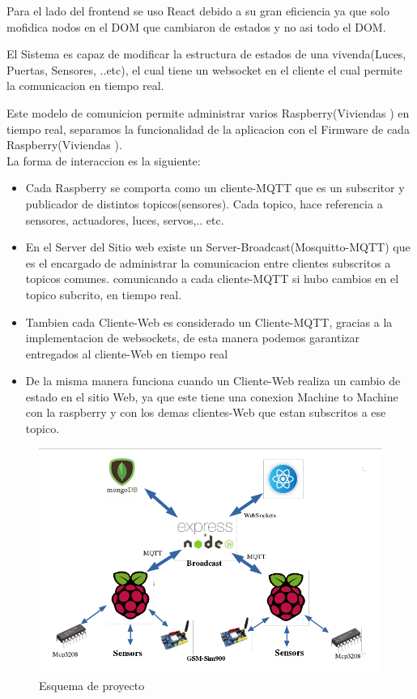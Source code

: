 \documentclass[letterpaper,12pt]{article}
\begin{document}
{		Para el lado del frontend se uso React debido a su gran eficiencia ya que solo mofidica nodos en el DOM que cambiaron de estados y no asi todo el DOM.
		
		El Sistema es capaz de modificar la estructura de estados de una vivenda(Luces, Puertas, Sensores, ..etc), el cual tiene un websocket en el cliente el cual permite la comunicacion en tiempo real.
		
		Este modelo de comunicion permite administrar varios Raspberry(Viviendas ) en tiempo real,  separamos la funcionalidad de la aplicacion con el Firmware de cada Raspberry(Viviendas ).\\
		
		La forma de interaccion  es la siguiente:
		
		\begin{itemize}
			\item Cada Raspberry se comporta como un cliente-MQTT que es un subscritor y publicador de distintos topicos(sensores). Cada topico, hace referencia a sensores, actuadores, luces, servos,.. etc.
			
			\item En el Server del Sitio web existe un Server-Broadcast(Mosquitto-MQTT) que es el encargado de administrar la comunicacion entre clientes subscritos a topicos comunes. comunicando a cada cliente-MQTT si hubo cambios en el topico subcrito, en tiempo real.
			
			\item Tambien cada Cliente-Web es considerado un Cliente-MQTT, gracias a la implementacion de websockets, de esta manera podemos garantizar entregados al cliente-Web en tiempo real
			
			\item De la misma manera funciona cuando un Cliente-Web realiza un cambio de estado en el sitio Web, ya que este tiene una conexion Machine to Machine con la raspberry y con los demas clientes-Web que estan subscritos a ese topico.
		\end{itemize}


		
		
		\begin{figure}[h]
			
			\begin{minipage}[t]{14cm}
				\includegraphics[width=14cm]{images/esquema1.png}	 %
				\caption{ Esquema de proyecto }
			\end{minipage}
			

\end{figure}}
\end{document}
